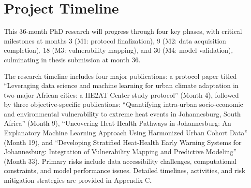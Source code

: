 \section{Project Timeline}
This 36-month PhD research will progress through four key phases, with critical milestones at months 3 (M1: protocol finalization), 9 (M2: data acquisition completion), 18 (M3: vulnerability mapping), and 30 (M4: model validation), culminating in thesis submission at month 36.

The research timeline includes four major publications: a protocol paper titled ``Leveraging data science and machine learning for urban climate adaptation in two major African cities: a HE2AT Center study protocol'' \cite{Jack} (Month 4), followed by three objective-specific publications: ``Quantifying intra-urban socio-economic and environmental vulnerability to extreme heat events in Johannesburg, South Africa'' (Month 9), ``Uncovering Heat-Health Pathways in Johannesburg: An Explanatory Machine Learning Approach Using Harmonized Urban Cohort Data'' (Month 19), and ``Developing Stratified Heat-Health Early Warning Systems for Johannesburg: Integration of Vulnerability Mapping and Predictive Modeling'' (Month 33).
Primary risks include data accessibility challenges, computational constraints, and model performance issues. Detailed timelines, activities, and risk mitigation strategies are provided in Appendix C.